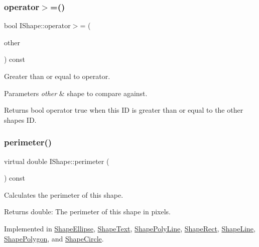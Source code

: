 \subsubsection{\texorpdfstring{operator$>$=()}{operator>=()}}
{\footnotesize\ttfamily bool I\+Shape\+::operator$>$= (\begin{DoxyParamCaption}\item[{const \mbox{\hyperlink{class_i_shape}{I\+Shape}} \&}]{other }\end{DoxyParamCaption}) const}



Greater than or equal to operator. 


\begin{DoxyParams}{Parameters}
{\em other} & shape to compare against. \\
\hline
\end{DoxyParams}
\begin{DoxyReturn}{Returns}
bool operator true when this ID is greater than or equal to the other shape\textquotesingle{}s ID. 
\end{DoxyReturn}
\mbox{\label{class_i_shape_a485f6770c4e56b31c76d368b959b6f00}} 
\subsubsection{\texorpdfstring{perimeter()}{perimeter()}}
{\footnotesize\ttfamily virtual double I\+Shape\+::perimeter (\begin{DoxyParamCaption}{ }\end{DoxyParamCaption}) const\hspace{0.3cm}{\ttfamily [pure virtual]}}



Calculates the perimeter of this shape. 

\begin{DoxyReturn}{Returns}
double\+: The perimeter of this shape in pixels. 
\end{DoxyReturn}


Implemented in \mbox{\hyperlink{class_shape_ellipse_a397c01c912105854e065f6c2d766f73a}{Shape\+Ellipse}}, \mbox{\hyperlink{class_shape_text_a76550783952e8dc25f187cd4996ebf2b}{Shape\+Text}}, \mbox{\hyperlink{class_shape_poly_line_a3d6664ada9c9dd883303a3dcb63d6188}{Shape\+Poly\+Line}}, \mbox{\hyperlink{class_shape_rect_a7dba46671dfd64188b37bff161d3bb89}{Shape\+Rect}}, \mbox{\hyperlink{class_shape_line_a68b22013926993e9bd9c2d146519a5af}{Shape\+Line}}, \mbox{\hyperlink{class_shape_polygon_acb81cc3272ad00038abd6f1a7a155b2e}{Shape\+Polygon}}, and \mbox{\hyperlink{class_shape_circle_ad393d13676b0d0fcb36346b9a90b74af}{Shape\+Circle}}.

